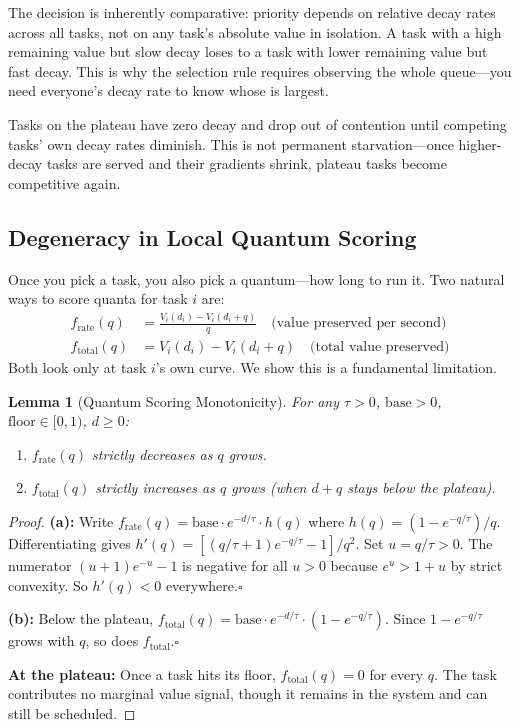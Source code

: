 \documentclass[10pt,twocolumn]{article}
\newtheorem{lemma}[theorem]{Lemma}
\theoremstyle{remark}
\begin{document}
The decision is inherently comparative: priority depends on relative
decay rates across all tasks, not on any task's absolute value in
isolation. A task with a high remaining value but slow decay loses to
a task with lower remaining value but fast decay. This is why the
selection rule requires observing the whole queue---you need
everyone's decay rate to know whose is largest.

Tasks on the plateau have zero decay and drop out of contention until
competing tasks' own decay rates diminish. This is not permanent
starvation---once higher-decay tasks are served and their gradients
shrink, plateau tasks become competitive again.

\subsection{Degeneracy in Local Quantum Scoring}
\label{sec:lemma}

Once you pick a task, you also pick a quantum---how long to run it.
Two natural ways to score quanta for task $i$ are:
\begin{align}
  f_{\mathrm{rate}}(q) &= \frac{V_i(d_i)-V_i(d_i+q)}{q}
  \quad\text{(value preserved per second)}
  \label{eq:frate}\\
  f_{\mathrm{total}}(q) &= V_i(d_i)-V_i(d_i+q)
  \quad\text{(total value preserved)}
  \label{eq:ftotal}
\end{align}
Both look only at task $i$'s own curve. We show this is a
fundamental limitation.

\begin{lemma}[Quantum Scoring Monotonicity]
\label{lem:mono}
For any $\tau>0$, $\mathrm{base}>0$,
$\mathrm{floor}\in[0,1)$, $d\geq0$:
\begin{enumerate}[label=(\alph*)]
  \item $f_{\mathrm{rate}}(q)$ strictly decreases as $q$ grows.
  \item $f_{\mathrm{total}}(q)$ strictly increases as $q$ grows
    (when $d+q$ stays below the plateau).
\end{enumerate}
\end{lemma}

\begin{proof}
\textbf{(a):} Write $f_{\mathrm{rate}}(q)=
\mathrm{base}\cdot e^{-d/\tau}\cdot h(q)$ where
$h(q)=(1-e^{-q/\tau})/q$. Differentiating gives
$h'(q)=[(q/\tau+1)e^{-q/\tau}-1]/q^2$. Set
$u=q/\tau>0$. The numerator $(u+1)e^{-u}-1$ is
negative for all $u>0$ because $e^u>1+u$ by strict
convexity. So $h'(q)<0$ everywhere.\hfill$\square$

\textbf{(b):} Below the plateau,
$f_{\mathrm{total}}(q)=\mathrm{base}\cdot e^{-d/\tau}
\cdot(1-e^{-q/\tau})$. Since $1-e^{-q/\tau}$ grows
with $q$, so does $f_{\mathrm{total}}$.\hfill$\square$

\textbf{At the plateau:} Once a task hits its floor,
$f_{\mathrm{total}}(q)=0$ for every $q$. The task
contributes no marginal value signal, though it
remains in the system and can still be scheduled.
\end{proof}
\end{document}
